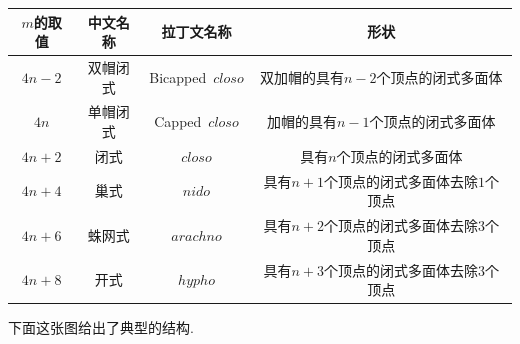 \documentclass{ctexart}
\begin{document}
\begin{table}[H]
    \centering\begin{tabular}{|c|c|c|c|}
        \hline
        $m$的取值   &中文名称   &拉丁文名称 &形状\\\hline
        $4n-2$  &双帽闭式   &Bicapped\ $\mathit{closo}$ & 双加帽的具有$n-2$个顶点的闭式多面体 \\\hline
        $4n$  &单帽闭式   &Capped\ $\mathit{closo}$ & 加帽的具有$n-1$个顶点的闭式多面体 \\\hline
        $4n+2$  &闭式   &$\mathit{closo}$ & 具有$n$个顶点的闭式多面体 \\\hline
        $4n+4$  &巢式   &$\mathit{nido}$ & 具有$n+1$个顶点的闭式多面体去除$1$个顶点 \\\hline
        $4n+6$  &蛛网式   &$\mathit{arachno}$ & 具有$n+2$个顶点的闭式多面体去除$3$个顶点 \\\hline
        $4n+8$  &开式   &$\mathit{hypho}$ & 具有$n+3$个顶点的闭式多面体去除$3$个顶点 \\\hline
    \end{tabular}
\end{table}
下面这张图给出了典型的结构.
\end{document}
